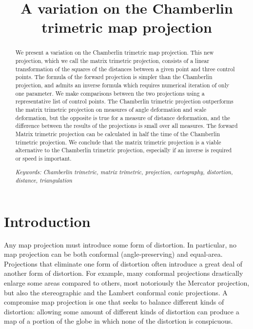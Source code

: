 \documentclass[]{interact}
\title{A variation on the Chamberlin trimetric map projection}
\begin{document}
\maketitle
\begin{abstract}%
   We present a variation on the Chamberlin trimetric map projection. This new
   projection, which we call the matrix trimetric projection, consists of a
   linear transformation of the squares of the distances between a given point
   and three control points. The formula of the forward projection is simpler
   than the Chamberlin projection, and admits an inverse formula which requires
   numerical iteration of only one parameter. We make comparisons between the
   two projections using a representative list of control points. The Chamberlin
   trimetric projection outperforms the matrix trimetric projection on measures
   of angle deformation and scale deformation, but the opposite is true for a
   measure of distance deformation, and the difference between the results of
   the projections is small over all measures. The forward Matrix trimetric
   projection can be calculated in half the time of the Chamberlin trimetric
   projection. We conclude that the matrix
   trimetric projection is a viable alternative to the Chamberlin trimetric
   projection, especially if an inverse is required or speed is important.

   \textit{Keywords: Chamberlin trimetric, matrix trimetric, projection,
   cartography, distortion, distance, triangulation}

\end{abstract}
\newpage

\section{Introduction}
Any map projection must introduce some form of distortion. In particular, no
map projection can be both conformal (angle-preserving) and equal-area.
Projections that eliminate one form of distortion often introduce a great deal
of another form of distortion. For example, many conformal projections
drastically enlarge some areas compared to others, most notoriously the
Mercator projection, but also the stereographic and the Lambert conformal conic
projections. \citep{snyder87} A compromise map projection is one that seeks to
balance different kinds of distortion: allowing some amount of different kinds
of distortion can produce a map of a portion of the globe
in which none of the distortion is conspicuous.
\end{document}
